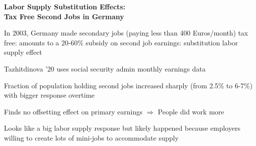 \documentclass[landscape]{slides}
\begin{document}
\begin{slide}

\end{slide}


\begin{slide}
\begin{center}
{\bf Labor Supply Substitution Effects: \\ Tax Free Second Jobs in Germany}
\end{center}

In 2003, Germany made secondary jobs (paying less than 400 Euros/month) tax free:
amounts to a 20-60\% subsidy on second job earnings: substitution labor supply effect

Tazhitdinova '20 uses social security admin monthly earnings data

Fraction of population holding second jobs increased sharply (from 2.5\% to 6-7\%)
with bigger response overtime

Finds no offsetting effect on primary earnings $\Rightarrow$ People did work more

Looks like a big labor supply response but likely happened because employers 
willing to create lots of mini-jobs to accommodate supply

\end{slide}

\begin{slide}

\end{slide}
\end{document}
